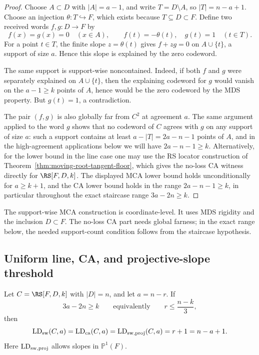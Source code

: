 \begin{proof}
Choose \(A\subset D\) with \(|A|=a-1\), and write
\(T=D\setminus A\), so \(|T|=n-a+1\).  Choose an injection
\(\theta:T\hookrightarrow F\), which exists because \(T\subseteq D\subset F\).
Define two received words \(f,g:D\to F\) by
\[
  f(x)=g(x)=0\quad (x\in A),
  \qquad
  f(t)=-\theta(t),\quad g(t)=1\quad (t\in T).
\]
For a point \(t\in T\), the finite slope \(z=\theta(t)\) gives
\(f+zg=0\) on \(A\cup\{t\}\), a support of size \(a\).  Hence this slope is
explained by the zero codeword.

The same support is support-wise noncontained.  Indeed, if both \(f\) and \(g\)
were separately explained on \(A\cup\{t\}\), then the explaining codeword for
\(g\) would vanish on the \(a-1\ge k\) points of \(A\), hence would be the zero
codeword by the MDS property.  But \(g(t)=1\), a contradiction.

The pair \((f,g)\) is also globally far from \(C^2\) at agreement \(a\).  The
same argument applied to the word \(g\) shows that no codeword of \(C\) agrees
with \(g\) on any support of size \(a\): such a support contains at least
\(a-|T|=2a-n-1\) points of \(A\), and in the high-agreement applications below we
will have \(2a-n-1\ge k\).  Alternatively, for the lower bound in the line case
one may use the RS locator construction of Theorem~\ref{thm:moving-root-tangent-floor},
which gives the no-loss CA witness directly for \(\RS[F,D,k]\).  The displayed
MCA lower bound holds unconditionally for \(a\ge k+1\), and the CA lower bound
holds in the range \(2a-n-1\ge k\), in particular throughout the exact staircase
range \(3a-2n\ge k\).
\end{proof}

\begin{remark}[scope]
The support-wise MCA construction is coordinate-level.  It uses MDS rigidity
and the inclusion \(D\subset F\).  The no-loss CA part needs global farness; in
the exact range below, the needed support-count condition follows from the
staircase hypothesis.
\end{remark}

\subsection{Uniform line, CA, and projective-slope threshold}

\begin{theorem}
\label{thm:uniform-line-staircase}
Let \(C=\RS[F,D,k]\) with \(|D|=n\), and let \(a=n-r\).  If
\[
  3a-2n\ge k
  \qquad\text{equivalently}\qquad
  r\le \frac{n-k}{3},
\]
then
\[
  \operatorname{LD}_{\rm sw}(C,a)
  =
  \operatorname{LD}_{\rm ca}(C,a)
  =
  \operatorname{LD}_{\rm sw,proj}(C,a)
  =
  r+1
  =n-a+1 .
\]
Here \(\operatorname{LD}_{\rm sw,proj}\) allows slopes in \(\mathbb P^1(F)\).
\end{theorem}

